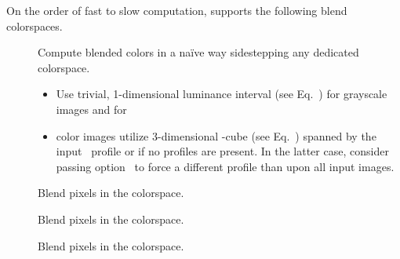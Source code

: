 \begin{codelist}
  On the order of fast to slow computation, \App{} supports the
  following blend colorspaces.
  \begin{description}
  \item[]
    \itemend Compute blended colors in a na\"ive way sidestepping any
    dedicated colorspace.
    \begin{itemize}
    \item
      Use trivial, 1-dimensional luminance interval (see
      Eq.~) for grayscale images
      and for
    \item
      color images utilize 3-dimensional
      -cube (see
      Eq.~) spanned by the input
      ~profile or
       if no profiles are
      present.  In the latter case, consider passing
      option~
      to force a different profile than  upon all input
      images.
    \end{itemize}

  \item[] \itemend Blend pixels in the
    colorspace.

  \item[] \itemend Blend pixels
    in the %
    colorspace.

  \item[]
    \itemend Blend pixels in the
    colorspace.
  \end{description}


\end{codelist}
